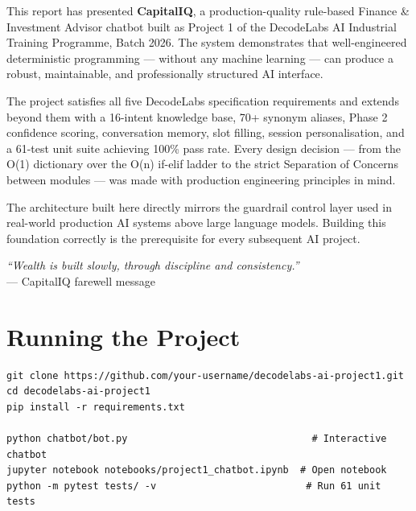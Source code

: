 \documentclass[12pt, a4paper]{article}
\begin{document}
This report has presented \textbf{CapitalIQ}, a production-quality rule-based
Finance \& Investment Advisor chatbot built as Project 1 of the DecodeLabs AI
Industrial Training Programme, Batch 2026. The system demonstrates that
well-engineered deterministic programming --- without any machine learning ---
can produce a robust, maintainable, and professionally structured AI interface.

The project satisfies all five DecodeLabs specification requirements and extends
beyond them with a 16-intent knowledge base, 70+ synonym aliases, Phase 2
confidence scoring, conversation memory, slot filling, session personalisation,
and a 61-test unit suite achieving 100\% pass rate. Every design decision ---
from the O(1) dictionary over the O(n) if-elif ladder to the strict Separation
of Concerns between modules --- was made with production engineering principles
in mind.

The architecture built here directly mirrors the guardrail control layer used in
real-world production AI systems above large language models. Building this
foundation correctly is the prerequisite for every subsequent AI project.

\bigskip
\begin{center}
  \textit{``Wealth is built slowly, through discipline and consistency.''}\\
  \small --- CapitalIQ farewell message
\end{center}

\appendix
\section{Running the Project}

\begin{infobox}
\begin{verbatim}
git clone https://github.com/your-username/decodelabs-ai-project1.git
cd decodelabs-ai-project1
pip install -r requirements.txt

python chatbot/bot.py                                # Interactive chatbot
jupyter notebook notebooks/project1_chatbot.ipynb  # Open notebook
python -m pytest tests/ -v                          # Run 61 unit tests
\end{verbatim}
\end{infobox}
\end{document}
